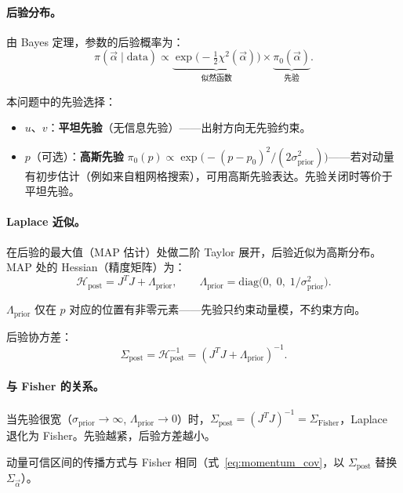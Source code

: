 \documentclass[a4paper, 11pt]{article}
\begin{document}
\paragraph{后验分布。}
由 Bayes 定理，参数的后验概率为：
\begin{equation}
  \pi(\vec{\alpha} \mid \mathrm{data})
  \propto \underbrace{\exp\bigl(-\tfrac{1}{2}\chi^2(\vec{\alpha})\bigr)}_{\text{似然函数}}
  \times \underbrace{\pi_0(\vec{\alpha})}_{\text{先验}}.
\end{equation}

本问题中的先验选择：
\begin{itemize}[nosep]
  \item $u$、$v$：\textbf{平坦先验}（无信息先验）——出射方向无先验约束。
  \item $p$（可选）：\textbf{高斯先验} $\pi_0(p) \propto \exp\bigl(-(p - p_0)^2 / (2\sigma_\mathrm{prior}^2)\bigr)$——若对动量有初步估计（例如来自粗网格搜索），可用高斯先验表达。先验关闭时等价于平坦先验。
\end{itemize}

\paragraph{Laplace 近似。}
在后验的最大值（MAP 估计）处做二阶 Taylor 展开，后验近似为高斯分布。MAP 处的 Hessian（精度矩阵）为：
\begin{equation}
  \mathcal{H}_\mathrm{post} = J^T J + \Lambda_\mathrm{prior},
  \qquad
  \Lambda_\mathrm{prior} = \mathrm{diag}\bigl(0,\; 0,\; 1/\sigma_\mathrm{prior}^2\bigr).
\end{equation}

$\Lambda_\mathrm{prior}$ 仅在 $p$ 对应的位置有非零元素——先验只约束动量模，不约束方向。

后验协方差：
\begin{equation}
  \Sigma_\mathrm{post} = \mathcal{H}_\mathrm{post}^{-1} = (J^T J + \Lambda_\mathrm{prior})^{-1}.
  \label{eq:laplace_cov}
\end{equation}

\paragraph{与 Fisher 的关系。}
当先验很宽（$\sigma_\mathrm{prior} \to \infty$, $\Lambda_\mathrm{prior} \to 0$）时，$\Sigma_\mathrm{post} = (J^TJ)^{-1} = \Sigma_\mathrm{Fisher}$，Laplace 退化为 Fisher。先验越紧，后验方差越小。

动量可信区间的传播方式与 Fisher 相同（式~\eqref{eq:momentum_cov}，以 $\Sigma_\mathrm{post}$ 替换 $\Sigma_{\vec{\alpha}}$）。
\end{document}

